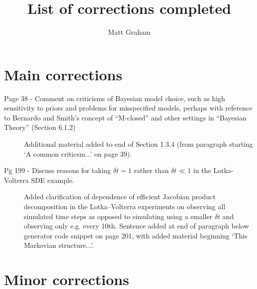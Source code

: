 \documentclass[10pt,a4paper]{article}
\author{Matt Graham}
\title{List of corrections completed}
\begin{document}
\maketitle

\section*{Main corrections}\label{main-corrections}

\begin{description}

\item[Page 38 - Comment on criticisms of Bayesian model choice, such as high
  sensitivity to priors and problems for misspecified models, perhaps
  with reference to Bernardo and Smith's concept of ``M-closed'' and
  other settings in ``Bayesian Theory'' (Section 6.1.2)]
  Additional material added to end of Section 1.3.4 (from paragraph starting `A common criticsm...' on page 39).
\item[Pg 199 - Discuss reasons for taking \(\delta t = 1\) rather than \(\delta t \ll 1\) in the Lotka-Volterra SDE example.]
  Added clarification of dependence of efficient Jacobian product decomposition in the Lotka--Volterra experiments on observing all simulated time steps as opposed to simulating using a smaller $\delta t$ and observing only e.g. every 10th. Sentence added at end of paragraph below generator code snippet on page 201, with added material beginning `This Markovian structure...'.
\end{description}

\section*{Minor corrections}\label{minor-corrections}
\end{document}
